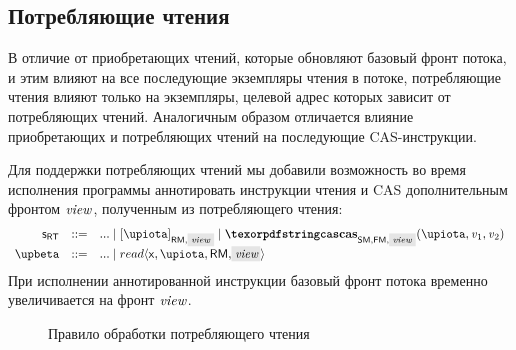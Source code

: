\subsection{Потребляющие чтения}
В отличие от приобретающих чтений, которые обновляют базовый фронт потока,
и этим влияют на все последующие экземпляры чтения в потоке,
потребляющие чтения влияют только на экземпляры,
целевой адрес которых зависит от потребляющих чтений.
Аналогичным образом отличается влияние приобретающих и потребляющих чтений
на последующие CAS-инструкции.

Для поддержки потребляющих чтений мы добавили возможность
во время исполнения программы аннотировать инструкции чтения и
CAS дополнительным фронтом $\stSigma$, полученным из потребляющего чтения:
%
\[\begin{array}{rcl}
\RT & ::= & ... \mid [\locVar]_{\RM,\text{\colorbox{gray!20}{\ensuremath{\stSigma}}}} \mid %
             \CasF{\SM}{\FM}{\locVar}{\mvalSubst_{1}}{\mvalSubst_{2}}{\text{\colorbox{gray!20}{\ensuremath{\stSigma}}}}
\\
\stPostOp & ::= & ... \mid read\angled{\vName, \locVar, \RM, \graybox{\stSigma}}
\end{array}\]
%
При исполнении аннотированной инструкции базовый фронт потока временно
увеличивается на фронт $\stSigma$.

\begin{figure}

\begin{mathpar}
\end{mathpar}
\caption{Правило обработки потребляющего чтения}
\label{fig:readcon}
\end{figure}


